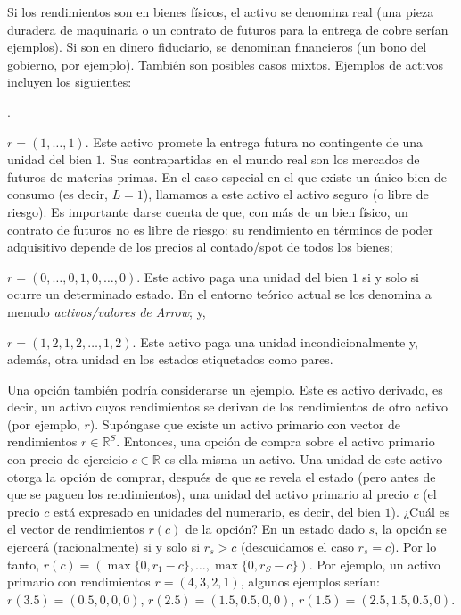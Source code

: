\documentclass[10pt,a4paper]{article}
\newcounter{numitem}
\newenvironment{lnum}
      {\begin{list}{\arabic{numitem}.}{%
          \usecounter{numitem}%
          \setlength{\leftmargin}{1cm}%
          \setlength{\parskip}{3pt}%
          \setlength{\itemsep}{0pt}%
          \setlength{\parsep}{0pt}%
      }}
      {\end{list}}
\begin{document}
Si los rendimientos son en bienes físicos, el activo se denomina real (una pieza duradera de maquinaria o un contrato de futuros para la entrega de cobre serían ejemplos). Si son en dinero fiduciario, se denominan financieros (un bono del gobierno, por ejemplo). También son posibles casos mixtos. Ejemplos de activos incluyen los siguientes:
\begin{lnum}
    \item $r=(1,\ldots,1)$. Este activo promete la entrega futura no contingente de una unidad del bien $1$. Sus contrapartidas en el mundo real son los mercados de futuros de materias primas. En el caso especial en el que existe un único bien de consumo (es decir, $L=1$), llamamos a este activo el activo seguro (o libre de riesgo). Es importante darse cuenta de que, con más de un bien físico, un contrato de futuros no es libre de riesgo: su rendimiento en términos de poder adquisitivo depende de los precios al contado/spot de todos los bienes;
    \item $r=(0,\ldots,0,1,0,\ldots,0)$. Este activo paga una unidad del bien $1$ si y solo si ocurre un determinado estado. En el entorno teórico actual se los denomina a menudo \textit{activos/valores de Arrow}; y,
    \item $r=(1,2,1,2,\ldots,1,2)$. Este activo paga una unidad incondicionalmente y, además, otra unidad en los estados etiquetados como pares.
\end{lnum}

Una opción también podría considerarse un ejemplo. Este es activo derivado, es decir, un activo cuyos rendimientos se derivan de los rendimientos de otro activo (por ejemplo, $r$). Supóngase que existe un activo primario con vector de rendimientos $r\in\mathbb{R}^S$. Entonces, una opción de compra sobre el activo primario con precio de ejercicio $c\in\mathbb{R}$ es ella misma un activo. Una unidad de este activo otorga la opción de comprar, después de que se revela el estado (pero antes de que se paguen los rendimientos), una unidad del activo primario al precio $c$ (el precio $c$ está expresado en unidades del numerario, es decir, del bien $1$). ¿Cuál es el vector de rendimientos $r(c)$ de la opción? En un estado dado $s$, la opción se ejercerá (racionalmente) si y solo si $r_s>c$ (descuidamos el caso $r_s=c$). Por lo tanto, $r(c)=(\max\{0,r_1-c\},\ldots,\max\{0,r_S-c\})$. Por ejemplo, un activo primario con rendimientos $r=(4,3,2,1)$, algunos ejemplos serían: $r(3.5)=(0.5,0,0,0)$, $r(2.5)=(1.5,0.5,0,0)$, $r(1.5)=(2.5,1.5,0.5,0)$.
\end{document}

